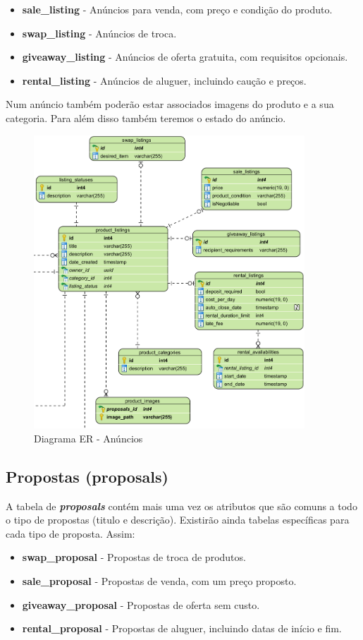 \documentclass[a4paper, 12pt]{article} %
\begin{document}
\begin{itemize}
	\item \textbf{sale\_listing} - Anúncios para venda, com preço e condição do produto.
	\item \textbf{swap\_listing} - Anúncios de troca.
	\item \textbf{giveaway\_listing} - Anúncios de oferta gratuita, com requisitos opcionais.
	\item \textbf{rental\_listing} - Anúncios de aluguer, incluindo caução e preços.
\end{itemize}
Num anúncio também poderão estar associados imagens do produto e a sua categoria. Para além disso também teremos o estado do anúncio.
\begin{figure}[H]
	\centering
	\includegraphics[width=\textwidth, height=11cm]{../images/entity-relationship-diagram-listings.png}
	\caption{Diagrama ER - Anúncios}
	\label{fig:ER Listings}
\end{figure}

\newpage

\subsection{\textbf{Propostas (proposals)}}
A tabela de \textbf{\textit{proposals}} contém mais uma vez os atributos que são comuns a todo o tipo de propostas (titulo e descrição). Existirão ainda tabelas específicas para cada tipo de proposta. Assim:



\begin{itemize}
	\item \textbf{swap\_proposal} - Propostas de troca de produtos.
	\item \textbf{sale\_proposal} - Propostas de venda, com um preço proposto.
	\item \textbf{giveaway\_proposal} - Propostas de oferta sem custo.
	\item \textbf{rental\_proposal} - Propostas de aluguer, incluindo datas de início e fim.
\end{itemize}
\end{document}
